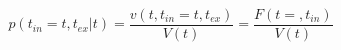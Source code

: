 \begin{equation}
p(t_{in}=t,t_{ex}|t)  = \frac{v(t,t_{in}=t,t_{ex})}{V(t)}= \frac{F(t=,t_{in})}{V(t)}
\end{equation}\begin{equation}

\end{equation}